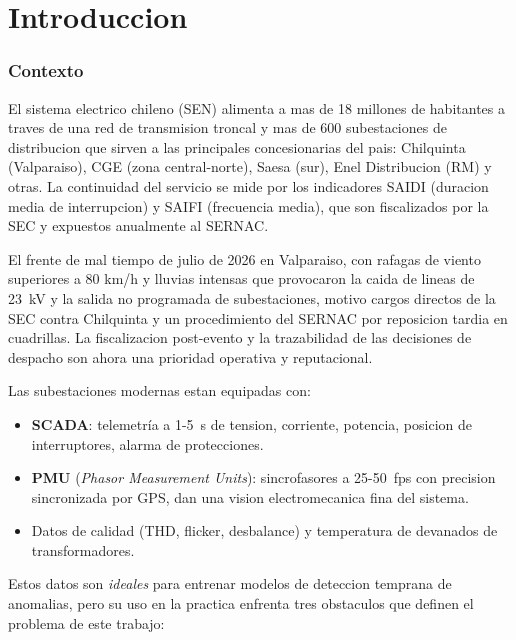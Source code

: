 \chapter{Introduccion}

\subsection{Contexto}

El sistema electrico chileno (SEN) alimenta a mas de 18 millones de habitantes
a traves de una red de transmision troncal y mas de 600 subestaciones de
distribucion que sirven a las principales concesionarias del pais:
Chilquinta (Valparaiso), CGE (zona central-norte), Saesa (sur), Enel Distribucion
(RM) y otras. La continuidad del servicio se mide por los indicadores SAIDI
(duracion media de interrupcion) y SAIFI (frecuencia media), que son
fiscalizados por la SEC y expuestos anualmente al SERNAC.

El frente de mal tiempo de julio de 2026 en Valparaiso, con rafagas de viento
superiores a 80 km/h y lluvias intensas que provocaron la caida de lineas de
23~kV y la salida no programada de subestaciones, motivo cargos directos de la
SEC contra Chilquinta y un procedimiento del SERNAC por reposicion tardia en
cuadrillas. La fiscalizacion post-evento y la trazabilidad de las decisiones
de despacho son ahora una prioridad operativa y reputacional.

Las subestaciones modernas estan equipadas con:
\begin{itemize}[leftmargin=*,itemsep=2pt]
  \item \textbf{SCADA}: telemetría a 1-5~s de tension, corriente, potencia,
        posicion de interruptores, alarma de protecciones.
  \item \textbf{PMU} (\emph{Phasor Measurement Units}): sincrofasores a
        25-50~fps con precision sincronizada por GPS, dan una vision
        electromecanica fina del sistema.
  \item Datos de calidad (THD, flicker, desbalance) y temperatura de
        devanados de transformadores.
\end{itemize}

Estos datos son \emph{ideales} para entrenar modelos de deteccion temprana
de anomalias, pero su uso en la practica enfrenta tres obstaculos que
definen el problema de este trabajo:

